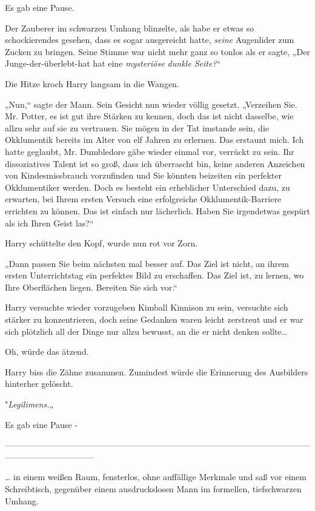 {Es gab eine Pause.

Der Zauberer im schwarzen Umhang blinzelte, als habe er etwas so schockierendes gesehen, dass es sogar ausgereicht hatte, \emph{seine} Augenlider zum Zucken zu bringen. Seine Stimme war nicht mehr ganz so tonlos als er sagte, „Der Junge-der-überlebt-hat hat eine \emph{mysteriöse dunkle Seite?}“

Die Hitze kroch Harry langsam in die Wangen.

„Nun,“ sagte der Mann. Sein Gesicht nun wieder völlig gesetzt. „Verzeihen Sie. Mr. Potter, es ist gut ihre Stärken zu kennen, doch das ist nicht dasselbe, wie allzu sehr auf sie zu vertrauen. Sie mögen in der Tat imstande sein, die Okklumentik bereits im Alter von elf Jahren zu erlernen. Das erstaunt mich. Ich hatte geglaubt, Mr. Dumbledore gäbe wieder einmal vor, verrückt zu sein. Ihr dissoziatives Talent ist so groß, dass ich überrascht bin, keine anderen Anzeichen von Kindesmissbrauch vorzufinden und Sie könnten beizeiten ein perfekter Okklumentiker werden. Doch es besteht ein erheblicher Unterschied dazu, zu erwarten, bei Ihrem ersten Versuch eine erfolgreiche Okklumentik-Barriere errichten zu können. Das ist einfach nur lächerlich. Haben Sie irgendetwas gespürt als ich Ihren Geist las?“

Harry schüttelte den Kopf, wurde nun rot vor Zorn.

„Dann passen Sie beim nächsten mal besser auf. Das Ziel ist nicht, an ihrem ersten Unterrichtstag ein perfektes Bild zu erschaffen. Das Ziel ist, zu lernen, wo Ihre Oberflächen liegen. Bereiten Sie sich vor.“

Harry versuchte wieder vorzugeben Kimball Kinnison zu sein, versuchte sich stärker zu konzentrieren, doch seine Gedanken waren leicht zerstreut und er war sich plötzlich all der Dinge nur allzu bewusst, an die er nicht denken sollte…

Oh, würde das ätzend.

Harry biss die Zähne zusammen. Zumindest würde die Erinnerung des Ausbilders hinterher gelöscht.

"\emph{Legilimens.}„

Es gab eine Pause -

--------------------------------------------------------------------------------------------------------------------------------------------

… in einem weißen Raum, fensterlos, ohne auffällige Merkmale und saß vor einem Schreibtisch, gegenüber einem ausdruckslosen Mann im formellen, tiefschwarzen Umhang.

}

